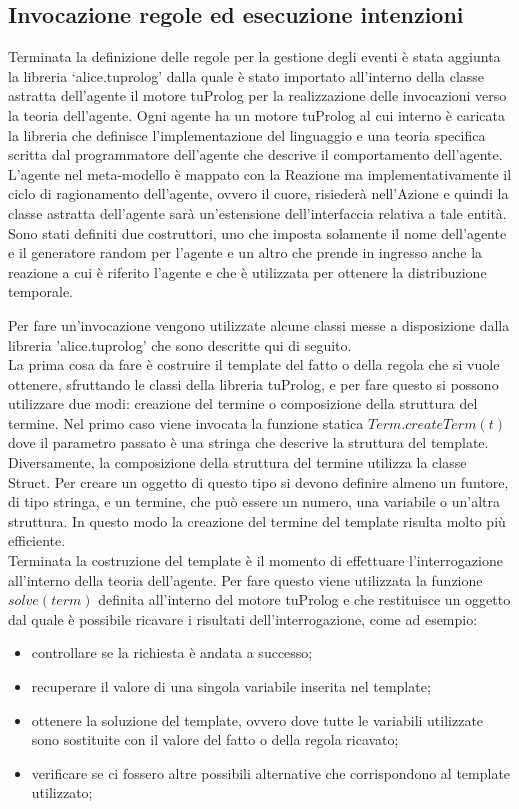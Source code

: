 \subsection{Invocazione regole ed esecuzione intenzioni}
Terminata la definizione delle regole per la gestione degli eventi è stata aggiunta la libreria `alice.tuprolog' dalla quale è stato importato all'interno della classe astratta dell'agente il motore tuProlog per la realizzazione delle invocazioni verso la teoria dell'agente.
Ogni agente ha un motore tuProlog al cui interno è caricata la libreria che definisce l'implementazione del linguaggio e una teoria specifica scritta dal programmatore dell'agente che descrive il comportamento dell'agente.
L'agente nel meta-modello è mappato con la Reazione ma implementativamente il ciclo di ragionamento dell'agente, ovvero il cuore, risiederà nell'Azione e quindi la classe astratta dell'agente sarà un'estensione dell'interfaccia relativa a tale entità.
Sono stati definiti due costruttori, uno che imposta solamente il nome dell'agente e il generatore random per l'agente e un altro che prende in ingresso anche la reazione a cui è riferito l'agente e che è utilizzata per ottenere la distribuzione temporale.

Per fare un'invocazione vengono utilizzate alcune classi messe a disposizione dalla libreria 'alice.tuprolog' che sono descritte qui di seguito.
\\
La prima cosa da fare è costruire il template del fatto o della regola che si vuole ottenere, sfruttando le classi della libreria tuProlog, e per fare questo si possono utilizzare due modi: creazione del termine o composizione della struttura del termine. Nel primo caso viene invocata la funzione statica $Term.createTerm(t)$ dove il parametro passato è una stringa che descrive la struttura del template. Diversamente, la composizione della struttura del termine utilizza la classe Struct. Per creare un oggetto di questo tipo si devono definire almeno un funtore, di tipo stringa, e un termine, che può essere un numero, una variabile o un'altra struttura. In questo modo la creazione del termine del template risulta molto più efficiente.
\\
Terminata la costruzione del template è il momento di effettuare l'interrogazione all'interno della teoria dell'agente. Per fare questo viene utilizzata la funzione $solve(term)$ definita all'interno del motore tuProlog e che restituisce un oggetto dal quale è possibile ricavare i risultati dell'interrogazione, come ad esempio:
\begin{itemize}
\item controllare se la richiesta è andata a successo;%
\item recuperare il valore di una singola variabile inserita nel template;%
\item ottenere la soluzione del template, ovvero dove tutte le variabili utilizzate sono sostituite con il valore del fatto o della regola ricavato;%
\item verificare se ci fossero altre possibili alternative che corrispondono al template utilizzato;%
\end{itemize}

